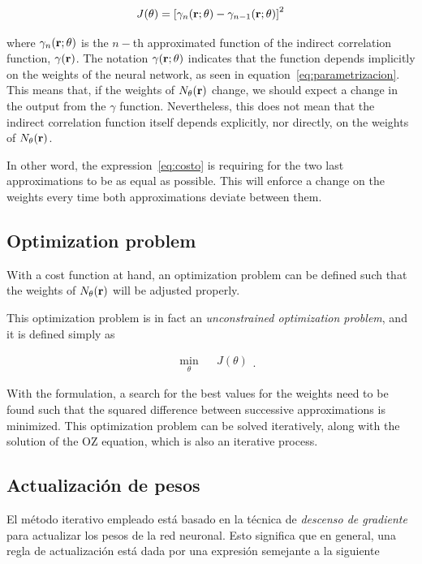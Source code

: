 \begin{equation}
    J(\theta) = \left[\gamma_{n}(\mathbf{r}; \theta) - \gamma_{n-1}(\mathbf{r}; \theta) \right]^2
    \label{eq:costo}
\end{equation}

where $\gamma_{n}(\mathbf{r}; \theta)$ is the $n-$th approximated function of the indirect
correlation function, $\gamma(\mathbf{r})$.
The notation $\gamma(\mathbf{r}; \theta)$ indicates that the function depends implicitly
on the weights of the neural network, as seen in equation~\eqref{eq:parametrizacion}.
This means that, if the weights of $N_{\theta}(\mathbf{r})$ change, we should expect a change in the output
from the $\gamma$ function. Nevertheless, this does not mean that the indirect
correlation function itself depends explicitly, nor directly, on the weights of
$N_{\theta}(\mathbf{r})$.

In other word, the expression~\eqref{eq:costo} is requiring for the two last approximations
to be as equal as possible. This will enforce a change on the weights every time both
approximations deviate between them.

\subsection{Optimization problem}
With a cost function at hand, an optimization problem can be defined such that the
weights of $N_{\theta}(\mathbf{r})$ will be adjusted properly.

This optimization problem is in fact an \emph{unconstrained optimization problem},
and it is defined simply as

\begin{equation}
    \begin{aligned}
         & \underset{\theta}{\text{min}}
         & & J(\theta)
    \end{aligned}
    .
    \label{eq:optimizacion}
\end{equation}

With the formulation, a search for the best values for the weights need to be found
such that the squared difference between successive approximations is minimized.
This optimization problem can be solved iteratively, along with the solution of the
OZ equation, which is also an iterative process.

\subsection{Actualización de pesos}
El método iterativo empleado está basado en la técnica de \emph{descenso de gradiente}
para actualizar los pesos de la red neuronal.
Esto significa que en general, una regla de actualización está dada por una expresión
semejante a la siguiente

